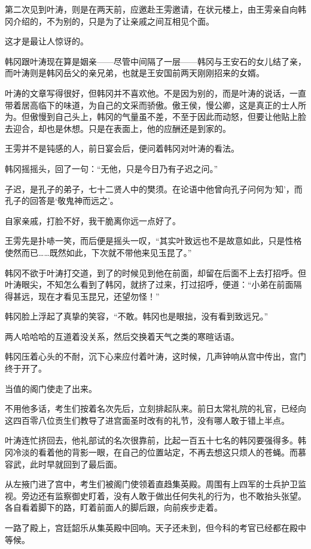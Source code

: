 第二次见到叶涛，则是在两天前，应邀赴王雱邀请，在状元楼上，由王雱亲自向韩冈介绍的，不为别的，只是为了让亲戚之间互相见个面。

这才是最让人惊讶的。

韩冈跟叶涛现在算是姻亲——尽管中间隔了一层——韩冈与王安石的女儿结了亲，而叶涛则是韩冈岳父的亲兄弟，也就是王安国前两天刚刚招来的女婿。

叶涛的文章写得很好，但韩冈并不喜欢他。不是因为别的，而是叶涛的说话，一直带着居高临下的味道，为自己的文采而骄傲。傲王侯，慢公卿，这是真正的士人所为。但傲慢到自己头上，韩冈的气量虽不差，不至于因此而动怒，但要让他贴上脸去迎合，却也是休想。只是在表面上，他的应酬还是到家的。

王雱并不是钝感的人，前日宴会后，便问着韩冈对叶涛的看法。

韩冈摇摇头，回了一句：“无他，只是今日乃有子迟之问。”

子迟，是孔子的弟子，七十二贤人中的樊须。在论语中他曾向孔子问何为‘知’，而孔子的回答是‘敬鬼神而远之’。

自家亲戚，打脸不好，我干脆离你远一点好了。

王雱先是扑哧一笑，而后便是摇头一叹，“其实叶致远也不是故意如此，只是性格使然而已……既然如此，下次就不带他来见玉昆了。”

韩冈不欲于叶涛打交道，到了的时候见到他在前面，却留在后面不上去打招呼。但叶涛眼尖，不知怎么看到了韩冈，就挤了过来，打过招呼，便道：“小弟在前面隔得甚远，现在才看见玉昆兄，还望勿怪！”

韩冈脸上浮起了真挚的笑容，“不敢。韩冈也是眼拙，没有看到致远兄。”

两人哈哈哈的互道着没关系，然后交换着天气之类的寒暄话语。

韩冈压着心头的不耐，沉下心来应付着叶涛，这时候，几声钟响从宫中传出，宫门终于开了。

当值的阁门使走了出来。

不用他多话，考生们按着名次先后，立刻排起队来。前日太常礼院的礼官，已经向这四百零八位贡生们教导了进宫面圣时改有的礼节，没有哪人敢于错上半点。

叶涛连忙挤回去，他礼部试的名次很靠前，比起一百五十七名的韩冈要强得多。韩冈冷淡的看着他的背影一眼，在自己的位置站定，不再去想这只烦人的苍蝇。而慕容武，此时早就回到了最后面。

从左掖门进了宫中，考生们被阁门使领着直趋集英殿。周围有上四军的士兵护卫监视。旁边还有监察御史盯着，没有人敢于做出任何失礼的行为，也不敢抬头张望。各自看着脚下的路，盯着前面人的脚后跟，向前疾步走着。

一路了殿上，宫廷韶乐从集英殿中回响。天子还未到，但今科的考官已经都在殿中等候。

